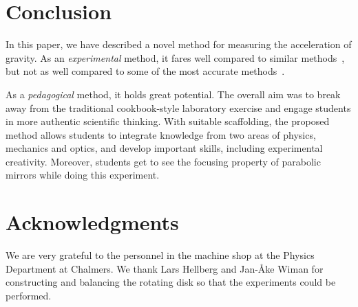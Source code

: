 \documentclass[11pt, a4paper, twocolumn, swedish, english]{article}
\begin{document}
\section{Conclusion}

In this paper, we have described a novel method for measuring the acceleration of gravity. 
As an \emph{experimental} method, it fares well compared to similar methods~\cite{IPhO2001}, 
but not as well compared to some of the most accurate methods~\cite{Candela2001}. 

As a \emph{pedagogical} method, it holds great potential. 
The overall aim was to break away from the traditional cookbook-style laboratory exercise and engage students in more 
authentic scientific thinking. With suitable scaffolding,
the proposed method allows students to integrate knowledge from two areas of physics, mechanics and optics,
and develop important skills, including experimental creativity. 
Moreover, students get to see the focusing property of parabolic mirrors while doing this experiment.

\section*{Acknowledgments}

We are very grateful to the personnel in the machine shop at the
Physics Department at Chalmers. We thank Lars Hellberg and Jan-Åke
Wiman for constructing and balancing the rotating disk so that the
experiments could be performed. 



\end{document}
